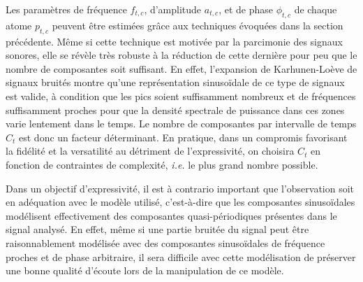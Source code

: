 Les paramètres de fréquence $f_{t, c}$, d'amplitude $a_{t, c}$, et de phase $\phi_{t, c}$ de chaque atome $p_{t, c}$ peuvent être estimées grâce aux techniques évoquées dans la section précédente. Même si cette technique est motivée par la parcimonie des signaux sonores, elle se révèle très robuste à la réduction de cette dernière pour peu que le nombre de composantes soit suffisant. En effet, l'expansion de Karhunen-Lo\`eve de signaux bruités montre qu'une représentation sinusoïdale de ce type de signaux est valide, à condition que les pics soient suffisamment nombreux et de fréquences suffisamment proches pour que la densité spectrale de puissance dans ces zones varie lentement dans le temps. Le nombre de composantes par intervalle de temps $C_t$ est donc un facteur déterminant. En pratique, dans un compromis favorisant la fidélité et la versatilité au détriment de l'expressivité, on choisira $C_t$ en fonction de contraintes de complexité, \textit{i.e.} le plus grand nombre possible.




Dans un objectif d'expressivité, il est à contrario important que l'observation  soit en adéquation avec le modèle utilisé, c'est-à-dire que les composantes sinusoïdales modélisent effectivement des composantes quasi-périodiques présentes dans le signal analysé. En effet, même si une partie bruitée du signal peut être raisonnablement modélisée avec des composantes sinusoïdales de fréquence proches et de phase arbitraire, il sera difficile avec cette modélisation de préserver une bonne qualité d'écoute lors de la manipulation de ce modèle.

